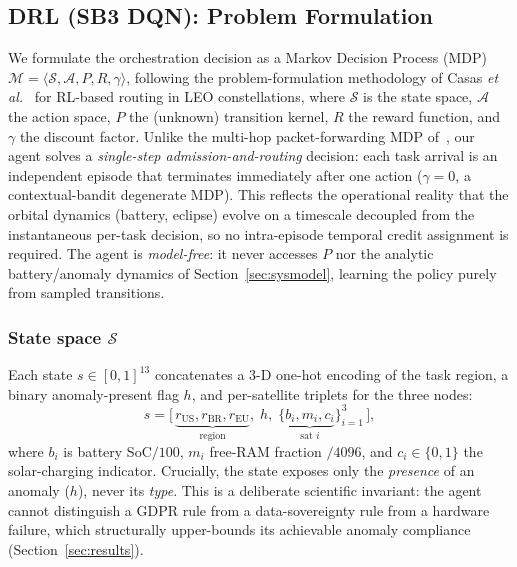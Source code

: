 \documentclass[conference,comsoc,twoside,caption=false]{IEEEtran}
\theoremstyle{definition}
\begin{document}
\subsection{DRL (SB3 DQN): Problem Formulation}
\label{sec:drl}

We formulate the orchestration decision as a Markov Decision Process (MDP)
$\mathcal{M} = \langle \mathcal{S}, \mathcal{A}, P, R, \gamma \rangle$, following
the problem-formulation methodology of Casas \emph{et al.}~\cite{casas2026} for
RL-based routing in \ac{LEO} constellations, where $\mathcal{S}$ is the state
space, $\mathcal{A}$ the action space, $P$ the (unknown) transition kernel, $R$
the reward function, and $\gamma$ the discount factor. Unlike the multi-hop
packet-forwarding MDP of~\cite{casas2026,jiang2025}, our agent solves a
\emph{single-step admission-and-routing} decision: each task arrival is an
independent episode that terminates immediately after one action ($\gamma = 0$,
a contextual-bandit degenerate MDP). This reflects the operational reality that
the orbital dynamics (battery, eclipse) evolve on a timescale decoupled from the
instantaneous per-task decision, so no intra-episode temporal credit assignment
is required. The agent is \emph{model-free}: it never accesses $P$ nor the
analytic battery/anomaly dynamics of Section~\ref{sec:sysmodel}, learning the
policy purely from sampled transitions.

\subsubsection*{State space $\mathcal{S}$}
Each state $s \in [0,1]^{13}$ concatenates a 3-D one-hot encoding of the task
region, a binary anomaly-present flag $h$, and per-satellite triplets for the
three nodes:
\begin{equation}
s = \bigl[\,\underbrace{r_{\mathrm{US}}, r_{\mathrm{BR}}, r_{\mathrm{EU}}}_{\text{region}},\;
      h,\;
      \{\underbrace{b_i, m_i, c_i}_{\text{sat } i}\}_{i=1}^{3}\,\bigr],
\label{eq:state}
\end{equation}
where $b_i$ is battery \ac{SoC}$/100$, $m_i$ free-RAM fraction $/4096$, and
$c_i \in \{0,1\}$ the solar-charging indicator. Crucially, the state exposes
only the \emph{presence} of an anomaly ($h$), never its \emph{type}. This is a
deliberate scientific invariant: the agent cannot distinguish a GDPR rule from a
data-sovereignty rule from a hardware failure, which structurally upper-bounds
its achievable anomaly compliance (Section~\ref{sec:results}).
\end{document}
